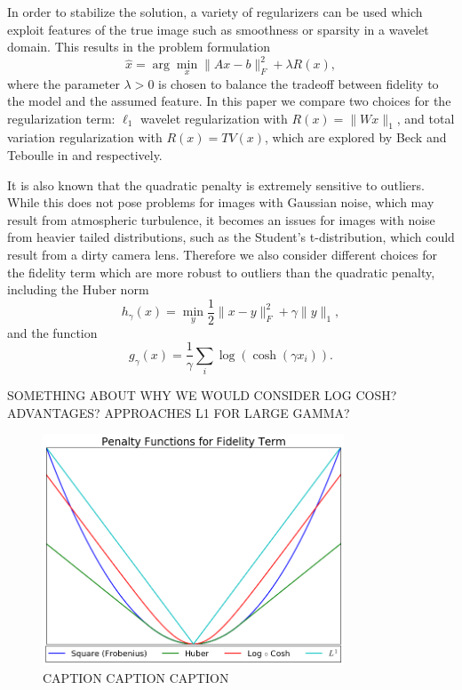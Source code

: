 \documentclass[10pt,a4paper]{article}
\begin{document}
In order to stabilize the solution, a variety of regularizers can be used which exploit features of the true image such as smoothness or sparsity in a wavelet domain. This results in the problem formulation
\begin{equation}
\hat{x} = \arg\min_{x} \| Ax - b \|_F^2 + \lambda R(x),
\end{equation}
where the parameter $\lambda > 0$ is chosen to balance the tradeoff between fidelity to the model and the assumed feature. In this paper we compare two choices for the regularization term: $\ell_1$ wavelet regularization with $R(x) = \| Wx \|_1$, and total variation regularization with $R(x) = TV(x)$, which are explored by Beck and Teboulle in \cite{TV} and \cite{FISTA} respectively.

It is also known that the quadratic penalty is extremely sensitive to outliers. While this does not pose problems for images with Gaussian noise, which may result from atmospheric turbulence, it becomes an issues for images with noise from heavier tailed distributions, such as the Student's t-distribution, which could result from a dirty camera lens. Therefore we also consider different choices for the fidelity term which are more robust to outliers than the quadratic penalty, including the Huber norm
\begin{equation} \label{huber}
h_{\gamma}(x) = \min_y \frac{1}{2} \| x - y \|_F^2 + \gamma \| y \|_1,
\end{equation}
and the function
\begin{equation} \label{log_cosh}
g_{\gamma}(x) = \frac{1}{\gamma} \sum_i \log\left(\cosh\left(\gamma x_i\right)\right).
\end{equation}

SOMETHING ABOUT WHY WE WOULD CONSIDER LOG COSH? ADVANTAGES? APPROACHES L1 FOR LARGE GAMMA? 

\begin{figure}[H]
\centering
\includegraphics[width=0.8\textwidth]{../figures/penalty_functions.png} 
\caption{CAPTION CAPTION CAPTION}
\end{figure}
\end{document}
